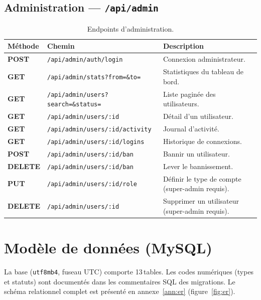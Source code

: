 \documentclass[11pt,a4paper,oneside]{report}
\newcommand{\mGET}{\textcolor{codeStr}{\textbf{GET}}}
\newcommand{\mPOST}{\textcolor{AlanyaIndigoStrong}{\textbf{POST}}}
\newcommand{\mPUT}{\textcolor{warning}{\textbf{PUT}}}
\newcommand{\mDEL}{\textcolor{danger}{\textbf{DELETE}}}
\newcommand{\thd}[1]{\textbf{\textcolor{AlanyaIndigoDark}{#1}}}
\begin{document}
\subsection{Administration --- \texttt{/api/admin}}
\begin{table}[H]
\centering
\begin{tabularx}{\linewidth}{@{}l p{6.5cm} X@{}}
\toprule
\thd{M\'{e}thode} & \thd{Chemin} & \thd{Description}\\
\midrule
\mPOST & \texttt{/api/admin/auth/login} & Connexion administrateur.\\
\mGET  & \texttt{/api/admin/stats?from=\&to=} & Statistiques du tableau de bord.\\
\mGET  & \texttt{/api/admin/users?search=\&status=} & Liste pagin\'{e}e des utilisateurs.\\
\mGET  & \texttt{/api/admin/users/:id} & D\'{e}tail d'un utilisateur.\\
\mGET  & \texttt{/api/admin/users/:id/activity} & Journal d'activit\'{e}.\\
\mGET  & \texttt{/api/admin/users/:id/logins} & Historique de connexions.\\
\mPOST & \texttt{/api/admin/users/:id/ban} & Bannir un utilisateur.\\
\mDEL  & \texttt{/api/admin/users/:id/ban} & Lever le bannissement.\\
\mPUT  & \texttt{/api/admin/users/:id/role} & D\'{e}finir le type de compte (super-admin requis).\\
\mDEL  & \texttt{/api/admin/users/:id} & Supprimer un utilisateur (super-admin requis).\\
\bottomrule
\end{tabularx}
\caption{Endpoints d'administration.}
\end{table}

\section{Mod\`{e}le de donn\'{e}es (MySQL)}
La base (\texttt{utf8mb4}, fuseau UTC) comporte 13\,tables. Les codes num\'{e}riques
(types et statuts) sont document\'{e}s dans les commentaires SQL des migrations.
Le sch\'{e}ma relationnel complet est pr\'{e}sent\'{e} en
annexe~\ref{ann:er} (figure~\ref{fig:er}).
\end{document}
